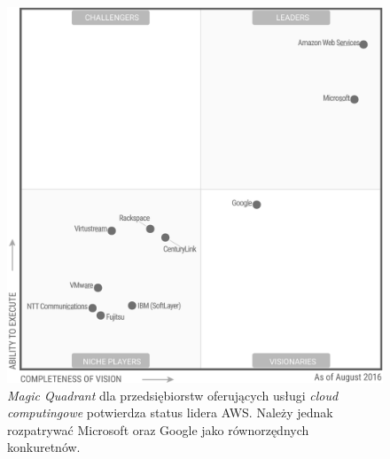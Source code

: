 \documentclass[12pt,a4paper,twoside]{article}
\begin{document}
\begin{figure}[h]
  \centering
\includegraphics[scale=0.8]{../obrazy/fig:mquad.png}
\caption{\textit{Magic Quadrant} dla przedsiębiorstw oferujących usługi \textit{cloud computingowe} potwierdza status lidera AWS. Należy jednak rozpatrywać Microsoft oraz Google jako równorzędnych konkuretnów.\label{fig:mquad}}
\end{figure}
\end{document}
